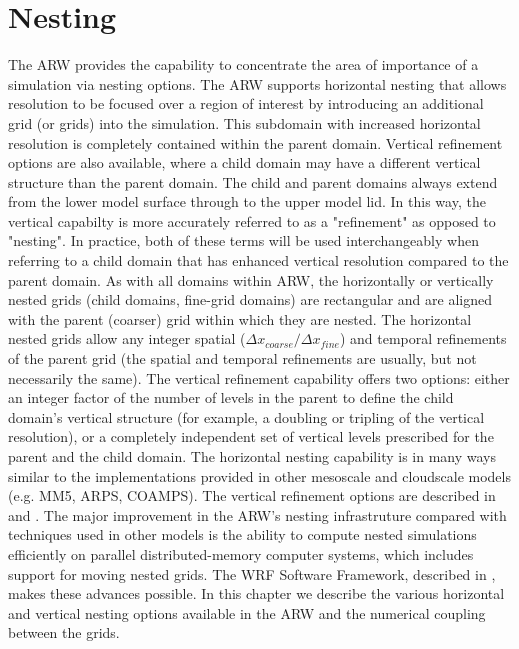 \chapter{Nesting}
\label{nesting_chap}

The ARW provides the capability to concentrate the area of importance of a simulation
via nesting options. 
The ARW supports horizontal nesting that allows resolution to be
focused over a region of interest by introducing an additional grid (or
grids) into the simulation.  This subdomain with increased horizontal resolution is completely
contained within the parent domain. Vertical refinement options are also 
available, where a child domain may have a different vertical structure than
the parent domain. The child and parent domains always extend from the lower model surface
through to the upper model lid. In this way, the vertical capabilty is more accurately referred
to as a "refinement" as opposed to "nesting". In practice, both of these terms will be used 
interchangeably when referring to a child domain that has enhanced vertical resolution 
compared to the parent domain.
As with all domains within ARW, the horizontally or vertically nested grids (child domains, 
fine-grid domains) are rectangular
and are aligned with the parent (coarser) grid within which they are
nested.  
The horizontal nested grids allow any integer spatial
($\Delta x_{coarse}/\Delta x_{fine}$) 
and temporal refinements of the
parent grid (the spatial and temporal refinements are usually,
but not necessarily the same).  
The vertical refinement capability offers two options: either an integer factor of the
number of levels in the parent to define the child domain's vertical structure (for example, 
a doubling or tripling of the vertical resolution), or a completely independent set of 
vertical levels prescribed for the parent and the child domain.
The horizontal nesting capability is in many ways similar to the
implementations provided in other mesoscale and cloudscale models (e.g. MM5,
ARPS, COAMPS). The vertical refinement options are described in 
\citet{mahalovmoustaoui09} and \citet{daniels16}.
The major improvement in the ARW's nesting
infrastruture compared with techniques used in other models is the ability to compute nested
simulations efficiently on parallel distributed-memory computer systems,
which includes support for moving nested grids.
The WRF Software Framework, described in
\citet{michalak04}, makes these advances possible.  In this chapter we
describe the various horizontal and vertical nesting options available in the ARW and the 
numerical coupling between the grids.

